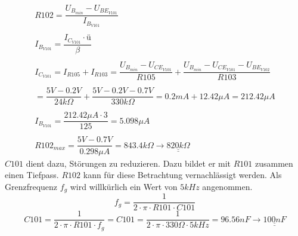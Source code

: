 %
\[ \begin{array}{l}
R102 
= \dfrac{U_{B_{min}} - U_{BE_{V101}}}{I_{B_{V101}}}\\\\
I_{B_{V101}} 
= \dfrac{I_{C_{V101}} \cdot ü}{\beta}\\\\
I_{C_{V101}} 
= I_{R105} + I_{R103} 
= \dfrac{U_{B_{min}} - U_{CE_{V101}}}{R105} + \dfrac{U_{B_{min}} - U_{CE_{V101}} - U_{BE_{V102}}}{R103} \\\\
= \dfrac{5 V - 0.2 V}{24 k \Omega} + \dfrac{5 V - 0.2 V - 0.7 V}{330 k \Omega} 
= 0.2 mA + 12.42 \mu A 
= 212.42 \mu A \\\\
I_{B_{V101}} 
= \dfrac{212.42 \mu A \cdot 3}{125} 
= 5.098 \mu A \\\\
R102_{max} 
= \dfrac{5 V - 0.7 V}{0.298 \mu A} 
= 843.4 k \Omega 
\rightarrow \underline{\underline{820 k \Omega}}
\end{array} \]
%
$C101$ dient dazu, Störungen zu reduzieren. Dazu bildet er mit $R101$ zusammen einen Tiefpass. $R102$ kann für diese Betrachtung vernachlässigt werden. Als Grenzfrequenz $f_g$ wird willkürlich ein Wert von $5 kHz$ angenommen. 
\[ f_g = \dfrac{1}{2 \cdot \pi \cdot R101 \cdot C101} \]
\[ C101 = \dfrac{1}{2 \cdot \pi \cdot R101 \cdot f_g} 
= C101 = \dfrac{1}{2 \cdot \pi \cdot 330 \Omega \cdot 5 kHz} = 96.56 nF 
\rightarrow \underline{\underline{100 nF}} \]

